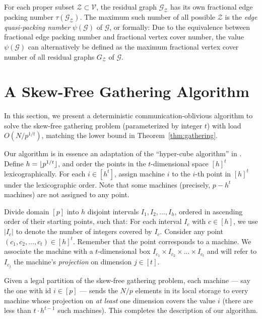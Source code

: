 \documentclass[sigconf]{acmart}
\def\vgap{\vspace{0mm}}
\def\G{\mathcal{G}}
\def\V{\mathcal{V}}
\def\Z{\mathcal{Z}}
\begin{document}
\vgap

For each proper subset $\Z \subset \V$, the residual graph $\G_\Z$ has its own fractional edge packing number $\tau(\G_\Z)$. The maximum such number of all possible $\Z$ is the {\em edge quasi-packing number} $\psi(\G)$ of $\G$, or formally:
\myeqn{
    \psi(\G) &=&
    \max_{\Z \subset \V} \tau(\G_\Z).
    \label{eqn:hypergraph:psi}
}
Due to the equivalence between fractional edge packing number and fractional vertex cover number, the value $\psi(\G)$ can alternatively be defined as the maximum fractional vertex cover number of all residual graphs $G_\Z$ of $\G$.

\section{A Skew-Free Gathering Algorithm} \label{app:sf-gathering-alg}

In this section, we present a deterministic communication-oblivious algorithm to solve the skew-free gathering problem (parameterized by integer $t$) with load $O(N / p^{1/t})$, matching the lower bound in Theorem~\ref{thm:gathering}.

\vgap

Our algorithm is in essence an adaptation of the ``hyper-cube algorithm'' in \cite{au11}. Define $h = \lfloor p^{1/t} \rfloor$, and order the points in the $t$-dimensional space $[h]^t$ lexicographically. For each $i \in [h^t]$, assign machine $i$ to the $i$-th point in $[h]^t$ under the lexicographic order. Note that some machines (precisely, $p - h^t$ machines) are not assigned to any point.

\vgap

Divide domain $[p]$ into $h$ disjoint intervals $I_1, I_2, ..., I_h$, ordered in ascending order of their starting points, such that:
For each interval $I_c$ with $c \in [h]$, we use $|I_c|$ to denote the number of integers covered by $I_c$. Consider any point $(c_1, c_2, ..., c_t) \in [h]^t$. Remember that the point corresponds to a machine. We associate the machine with a $t$-dimensional box $I_{c_1} \times I_{c_2} \times ... \times I_{c_t}$ and will refer to $I_{c_j}$ the machine's {\em projection} on dimension $j \in [t]$.

\vgap

Given a legal partition of the skew-free gathering problem, each machine --- say the one with id $i \in [p]$ --- sends the $N/p$ elements in its local storage to every machine whose projection on {\em at least} one dimension covers the value $i$ (there are less than $t \cdot h^{t-1}$ such machines). This completes the description of our algorithm.
\end{document}
